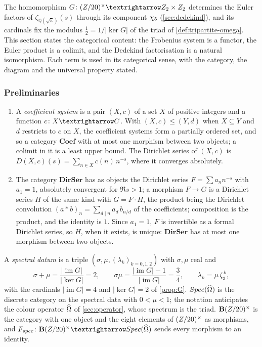 The homomorphism $G\colon\Zst\to\mathbb{Z}_2\times\mathbb{Z}_2$ determines the
Euler factors of $\zeta_{\mathbb{Q}(\sqrt{5})}(s)$ through its component $\chi_5$ (\cref{sec:dedekind}), and its
cardinals fix the modulus $\tfrac12=1/|\ker G|$ of the triad of \cref{def:tripartite-omega}.  This section states
the categorical content: the Frobenius system is a functor, the Euler product is a colimit, and the Dedekind
factorisation is a natural isomorphism.  Each term is used in its categorical sense, with the category, the diagram
and the universal property stated.

\subsubsection{Preliminaries}\label{ssec:cat-prelim}

\begin{definition}\label{def:DirSer}
\leavevmode
\begin{enumerate}[label=\textup{(\roman*)}]
  \item A \emph{coefficient system} is a pair $(X,c)$ of a set $X$ of positive integers and a function
    $c\colon X\to\C$.  With $(X,c)\le(Y,d)$ when $X\subseteq Y$ and $d$ restricts to $c$ on $X$, the coefficient
    systems form a partially ordered set, and so a category $\mathbf{Coef}$ with at most one morphism between two
    objects; a colimit in it is a least upper bound.  The Dirichlet series of $(X,c)$ is
    $D(X,c)(s)=\sum_{n\in X}c(n)\,n^{-s}$, where it converges absolutely.
  \item The category $\mathbf{DirSer}$ has as objects the Dirichlet series $F=\sum a_nn^{-s}$ with $a_1=1$,
    absolutely convergent for $\Re s>1$; a morphism $F\to G$ is a Dirichlet series $H$ of the same kind with
    $G=F\cdot H$, the product being the Dirichlet convolution $(a*b)_n=\sum_{d\mid n}a_d\,b_{n/d}$ of the
    coefficients; composition is the product, and the identity is $1$.  Since $a_1=1$, $F$ is invertible as a formal
    Dirichlet series, so $H$, when it exists, is unique: $\mathbf{DirSer}$ has at most one morphism between two
    objects.
\end{enumerate}
\end{definition}

\begin{definition}\label{def:SpecOmega}
A \emph{spectral datum} is a triple $(\sigma,\mu,(\lambda_k)_{k=0,1,2})$ with $\sigma,\mu$ real and
\[
  \sigma+\mu=\frac{|\operatorname{im}G|}{|\ker G|}=2,\qquad
  \sigma\mu=\frac{|\operatorname{im}G|-1}{|\operatorname{im}G|}=\frac34,\qquad
  \lambda_k=\mu\,\zeta_3^{\,k},
\]
with the cardinals $|\operatorname{im}G|=4$ and $|\ker G|=2$ of \cref{prop:G}.  $Spec(\widehat{\Omega})$ is the discrete
category on the spectral data with $0<\mu<1$; the notation anticipates the colour operator $\widehat{\Omega}$ of
\cref{sec:operator}, whose spectrum is the triad.  $\mathbf{B}(Z/20)^{\times}$ is the category with one object and the eight
elements of $(Z/20)^{\times}$ as morphisms, and $F_{\mathrm{spec}}\colon\mathbf{B}\Zst\to\mathrm{Spec}(\OmH)$ sends every
morphism to an identity.
\end{definition}

